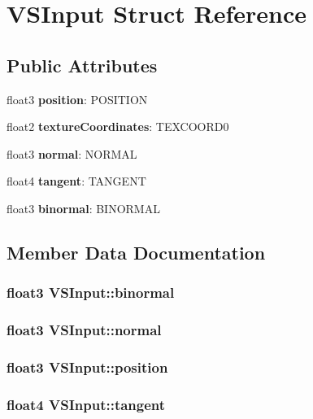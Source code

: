 \section{VSInput Struct Reference}
\label{struct_v_s_input}
\subsection*{Public Attributes}
\begin{DoxyCompactItemize}
\item 
float3 {\bf position}: POSITION
\item 
float2 {\bf textureCoordinates}: TEXCOORD0
\item 
float3 {\bf normal}: NORMAL
\item 
float4 {\bf tangent}: TANGENT
\item 
float3 {\bf binormal}: BINORMAL
\end{DoxyCompactItemize}


\subsection{Member Data Documentation}
\subsubsection[{binormal}]{\setlength{\rightskip}{0pt plus 5cm}float3 {\bf VSInput::binormal}}\label{struct_v_s_input_aef4a4114e46e037f6b4d624da7915e7c}
\subsubsection[{normal}]{\setlength{\rightskip}{0pt plus 5cm}float3 {\bf VSInput::normal}}\label{struct_v_s_input_a35455e47d232796105794746b83411a2}
\subsubsection[{position}]{\setlength{\rightskip}{0pt plus 5cm}float3 {\bf VSInput::position}}\label{struct_v_s_input_aed491629cd84dfab85cf7183f180e91b}
\subsubsection[{tangent}]{\setlength{\rightskip}{0pt plus 5cm}float4 {\bf VSInput::tangent}}\label{struct_v_s_input_ae40739bf6da27046f3de2cf11d37a23a}
